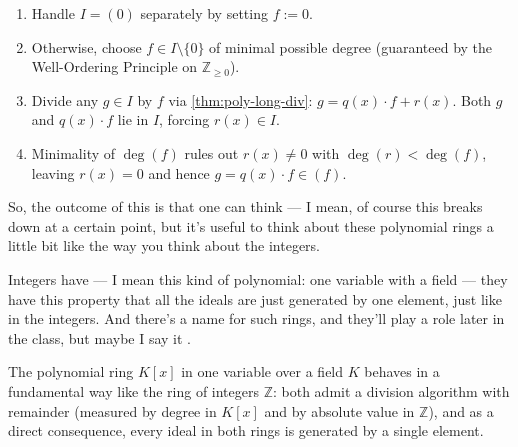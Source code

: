 \begin{proofWrapper}
\begin{content}[Analyzing the Remainder and Concluding \texorpdfstring{$I = (f)$}{I = (f)}]
\begin{steps}
\begin{enumerate}[label=\textbf{\arabic*.}]
    \setcounter{enumi}{0} \item Handle $I = (0)$ separately by setting $f := 0$.
    \setcounter{enumi}{1} \item Otherwise, choose $f \in I \setminus \{0\}$ of minimal possible degree (guaranteed by the Well-Ordering Principle on $\mathbb{Z}_{\ge 0}$).
    \setcounter{enumi}{2} \item Divide any $g \in I$ by $f$ via \cref{thm:poly-long-div}: $g = q(x) \cdot f + r(x)$. Both $g$ and $q(x) \cdot f$ lie in $I$, forcing $r(x) \in I$.
    \setcounter{enumi}{3} \item Minimality of $\deg(f)$ rules out $r(x) \neq 0$ with $\deg(r) < \deg(f)$, leaving $r(x) = 0$ and hence $g = q(x) \cdot f \in (f)$.
\end{enumerate}
\end{steps}
\end{content}

\end{proofWrapper}

\begin{speech}[00:36:27 - 00:36:58]
So, the outcome of this is that one can think --- I mean, of course this breaks down at a certain point, but it's useful to think about these polynomial rings a little bit like the way you think about the integers.

Integers have --- I mean this kind of polynomial: one variable with a field --- they have this property that all the ideals are just generated by one element, just like in the integers. And there's a name for such rings, and they'll play a role later in the class, but maybe I say it .
\end{speech}

\begin{insight}
The polynomial ring $K[x]$ in one variable over a field $K$ behaves in a fundamental way like the ring of integers $\mathbb{Z}$: both admit a division algorithm with remainder (measured by degree in $K[x]$ and by absolute value in $\mathbb{Z}$), and as a direct consequence, every ideal in both rings is generated by a single element.
\end{insight}

